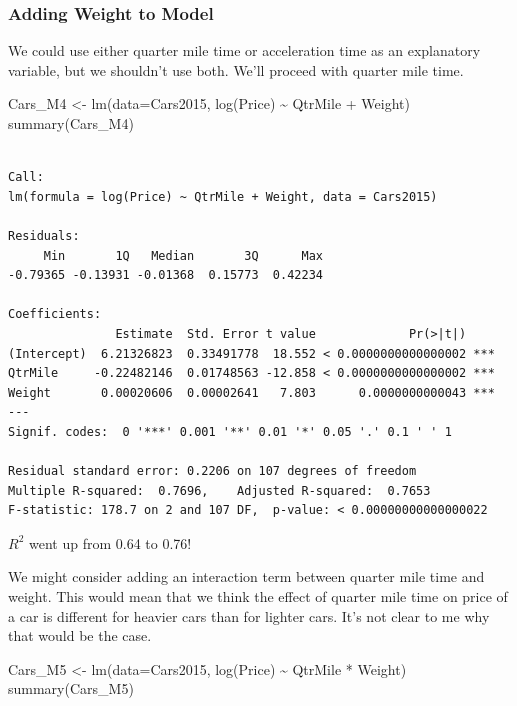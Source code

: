 \documentclass[
  letterpaper,
  DIV=11,
  numbers=noendperiod]{scrreprt}
\newenvironment{Shaded}{\begin{snugshade}}{\end{snugshade}}
\newcommand{\AttributeTok}[1]{\textcolor[rgb]{0.40,0.45,0.13}{#1}}
\newcommand{\FunctionTok}[1]{\textcolor[rgb]{0.28,0.35,0.67}{#1}}
\newcommand{\NormalTok}[1]{\textcolor[rgb]{0.00,0.23,0.31}{#1}}
\newcommand{\OtherTok}[1]{\textcolor[rgb]{0.00,0.23,0.31}{#1}}
\newcommand{\SpecialCharTok}[1]{\textcolor[rgb]{0.37,0.37,0.37}{#1}}
\begin{document}
\subsubsection{Adding Weight to Model}\label{adding-weight-to-model}

We could use either quarter mile time or acceleration time as an
explanatory variable, but we shouldn't use both. We'll proceed with
quarter mile time.

\begin{Shaded}
\begin{Highlighting}[]
\NormalTok{Cars\_M4 }\OtherTok{\textless{}{-}} \FunctionTok{lm}\NormalTok{(}\AttributeTok{data=}\NormalTok{Cars2015, }\FunctionTok{log}\NormalTok{(Price) }\SpecialCharTok{\textasciitilde{}}\NormalTok{ QtrMile }\SpecialCharTok{+}\NormalTok{ Weight)}
\FunctionTok{summary}\NormalTok{(Cars\_M4)}
\end{Highlighting}
\end{Shaded}

\begin{verbatim}

Call:
lm(formula = log(Price) ~ QtrMile + Weight, data = Cars2015)

Residuals:
     Min       1Q   Median       3Q      Max 
-0.79365 -0.13931 -0.01368  0.15773  0.42234 

Coefficients:
               Estimate  Std. Error t value             Pr(>|t|)    
(Intercept)  6.21326823  0.33491778  18.552 < 0.0000000000000002 ***
QtrMile     -0.22482146  0.01748563 -12.858 < 0.0000000000000002 ***
Weight       0.00020606  0.00002641   7.803      0.0000000000043 ***
---
Signif. codes:  0 '***' 0.001 '**' 0.01 '*' 0.05 '.' 0.1 ' ' 1

Residual standard error: 0.2206 on 107 degrees of freedom
Multiple R-squared:  0.7696,    Adjusted R-squared:  0.7653 
F-statistic: 178.7 on 2 and 107 DF,  p-value: < 0.00000000000000022
\end{verbatim}

\(R^2\) went up from 0.64 to 0.76!

We might consider adding an interaction term between quarter mile time
and weight. This would mean that we think the effect of quarter mile
time on price of a car is different for heavier cars than for lighter
cars. It's not clear to me why that would be the case.

\begin{Shaded}
\begin{Highlighting}[]
\NormalTok{Cars\_M5 }\OtherTok{\textless{}{-}} \FunctionTok{lm}\NormalTok{(}\AttributeTok{data=}\NormalTok{Cars2015, }\FunctionTok{log}\NormalTok{(Price) }\SpecialCharTok{\textasciitilde{}}\NormalTok{ QtrMile }\SpecialCharTok{*}\NormalTok{ Weight)}
\FunctionTok{summary}\NormalTok{(Cars\_M5)}
\end{Highlighting}
\end{Shaded}
\end{document}

